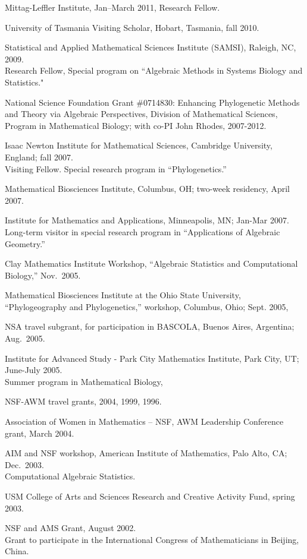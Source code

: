 \documentclass[10pt]{report}
\begin{document}
{Mittag-Leffler Institute, Jan--March 2011, Research Fellow.

University of Tasmania Visiting Scholar, Hobart, Tasmania, fall 2010.

Statistical and Applied Mathematical Sciences Institute (SAMSI),  Raleigh, NC, 2009.\\
Research Fellow, Special program on ``Algebraic Methods in Systems
Biology and Statistics."

 National Science Foundation Grant \#0714830: Enhancing Phylogenetic
 Methods and Theory via Algebraic Perspectives, Division of
 Mathematical Sciences, Program in Mathematical Biology; with co-PI
 John Rhodes,
2007-2012.

Isaac Newton Institute for Mathematical Sciences, Cambridge
University, England; fall 2007.\\
Visiting Fellow.  Special research program in ``Phylogenetics.''

Mathematical Biosciences Institute, Columbus, OH;
two-week residency, April 2007.

Institute for Mathematics and Applications, Minneapolis, MN; Jan-Mar
2007.\\ Long-term visitor in special research program in
``Applications of Algebraic Geometry.''

Clay Mathematics Institute Workshop, ``Algebraic Statistics and
Computational Biology,'' Nov.~2005.

Mathematical Biosciences Institute at the Ohio State University,
``Phylogeography and Phylogenetics,'' workshop, Columbus, Ohio; Sept.
2005,

NSA travel subgrant, for participation in BASCOLA, Buenos Aires,
Argentina; Aug.~2005.

Institute for Advanced Study - Park City Mathematics Institute, Park
City, UT; June-July 2005.\\  Summer program in Mathematical Biology,

NSF-AWM travel grants, 2004, 1999, 1996.

Association of Women in Mathematics -- NSF, AWM Leadership Conference
grant, March 2004.

AIM and NSF workshop, American Institute of Mathematics, Palo Alto, CA; Dec.~2003.\\
Computational Algebraic Statistics.

USM College of Arts and Sciences Research and Creative Activity Fund,
spring 2003.

NSF and AMS Grant, August 2002.\\
Grant to participate in the {International Congress of Mathematicians}
in Beijing, China.

}
\end{document}
